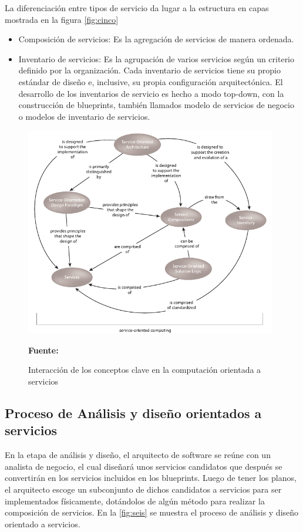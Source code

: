 La diferenciación entre tipos de servicio da lugar a la estructura en capas mostrada en la figura \ref{fig:cinco}

\begin{itemize}
  \item Composición de servicios: Es la agregación de servicios de manera ordenada.
  \item Inventario de servicios: Es la agrupación de varios servicios según un criterio definido por la organización. Cada inventario de servicios tiene su propio estándar de diseño e, inclusive, su propia configuración arquitectónica. El desarrollo de los inventarios de servicio es hecho a modo top-down, con la construcción de blueprints, también llamados modelo de servicios de negocio o modelos de inventario de servicios.
\end{itemize}

\begin{figure}[!htb]
  \begin{center}
    \includegraphics[width=11cm]{./imagenes/4.png}
    \caption{Interacción de los conceptos clave en la computación orientada a servicios}
    \label{fig:cuatro}
    \textbf{Fuente:}  \cite{soa_principles}
  \end{center}
\end{figure}

\subsection{Proceso de Análisis y diseño orientados a servicios}

En la etapa de análisis y diseño, el arquitecto de software se reúne con un analista de negocio, el cual diseñará unos servicios candidatos que después se convertirán en los servicios incluidos en los blueprints. Luego de tener los planos, el arquitecto escoge un subconjunto de dichos candidatos a servicios para ser implementados físicamente, dotándolos de algún método para realizar la composición de servicios. En la \ref{fig:seis} se muestra el proceso de análisis y diseño orientado a servicios.

